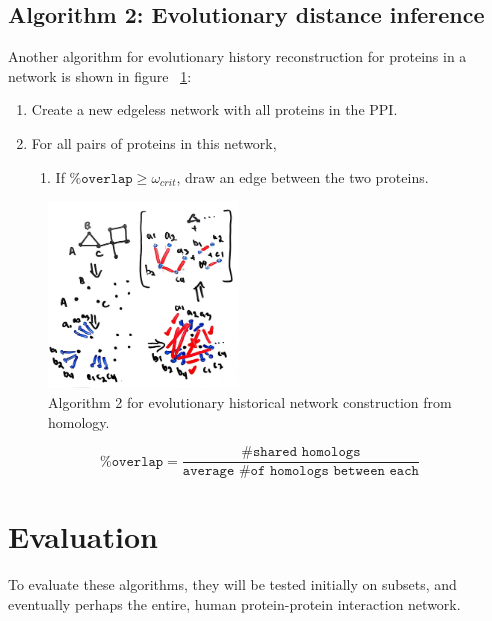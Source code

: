 \documentclass{acmsiggraph}               %
\begin{document}
\subsection{Algorithm 2: Evolutionary distance inference}

Another algorithm for evolutionary history reconstruction for proteins in a network is shown in figure ~\ref{fig:algo2}:

\begin{enumerate}
    \item Create a new edgeless network with all proteins in the PPI.
    \item For all pairs of proteins in this network,
    \begin{enumerate}
        \item If \(\texttt{\% overlap} \ge \omega_{crit}\), draw an edge between the two proteins.
    \end{enumerate}
\end{enumerate}

\begin{figure}
    \begin{center}
        \includegraphics[width=0.45\textwidth]{images/algo_2.jpg}
    \end{center}
    \caption{Algorithm 2 for evolutionary historical network construction from homology.}
    \label{fig:algo2}
\end{figure}

\begin{equation}
    \texttt{\% overlap} = \frac{\texttt{\# shared homologs}}{\texttt{average \# of homologs between each}}
\end{equation}

\section{Evaluation}
\label{sec:evaluation}
To evaluate these algorithms, they will be tested initially on subsets, and eventually perhaps the entire, human protein-protein interaction network.
\end{document}
